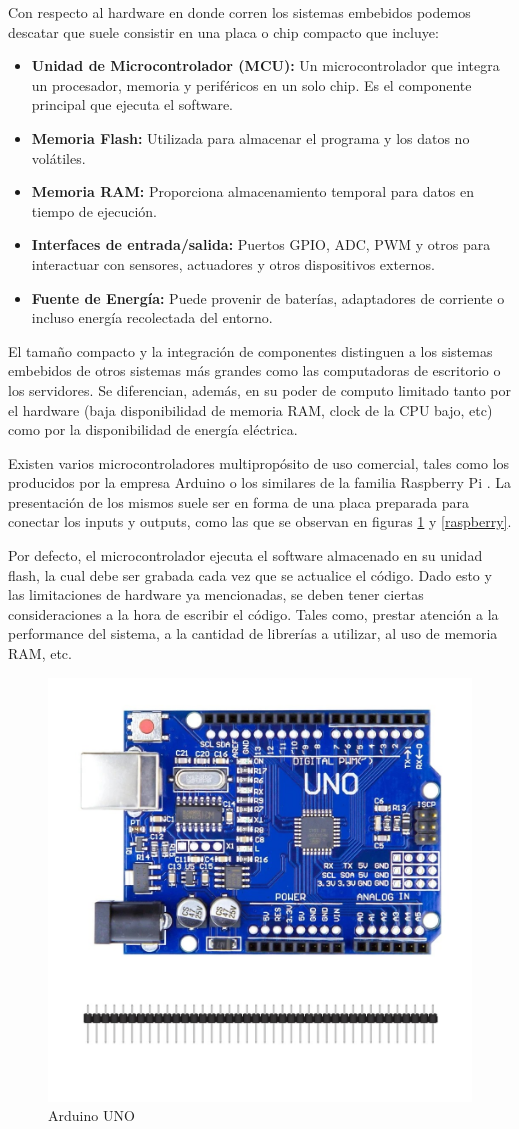 Con respecto al hardware en donde corren los sistemas embebidos podemos descatar que suele consistir en una placa o chip compacto que incluye:
\begin{itemize}
    \item \textbf{Unidad de Microcontrolador (MCU):} Un microcontrolador que integra un procesador, memoria y perif\'ericos en un solo chip. Es el componente principal que ejecuta el software.
    \item \textbf{Memoria Flash:} Utilizada para almacenar el programa y los datos no vol\'atiles.
    \item \textbf{Memoria RAM:} Proporciona almacenamiento temporal para datos en tiempo de ejecuci\'on.
    \item \textbf{Interfaces de entrada/salida:} Puertos \gls{GPIO}, \gls{ADC}, \gls{PWM} y otros para interactuar con sensores, actuadores y otros dispositivos externos.
    \item \textbf{Fuente de Energ\'ia:} Puede provenir de bater\'ias, adaptadores de corriente o incluso energ\'ia recolectada del entorno.
\end{itemize}
El tama\~no compacto y la integraci\'on de componentes distinguen a los sistemas embebidos de otros sistemas m\'as grandes como las computadoras de escritorio o los servidores. Se diferencian, además, en su poder de computo limitado tanto por el hardware (baja disponibilidad de memoria RAM, \gls{clock} de la CPU bajo, etc) como por la disponibilidad de energía eléctrica.

Existen varios microcontroladores multipropósito de uso comercial, tales como los producidos por la empresa Arduino \cite{arduinoMicro} o los similares de la familia  Raspberry Pi \cite{raspMicro}. La presentación de los mismos suele ser en forma de una placa preparada para conectar los inputs y outputs, como las que se observan en figuras \ref{arduinoUNO} y \ref{raspberry}.

Por defecto, el microcontrolador ejecuta el software almacenado en su unidad flash, la cual debe ser grabada cada vez que se actualice el código. Dado esto y las limitaciones de hardware ya mencionadas, se deben tener ciertas consideraciones a la hora de escribir el código. Tales como, prestar atención a la performance del sistema, a la cantidad de librerías a utilizar, al uso de memoria RAM, etc.

\begin{figure}[h!]
	\caption{Arduino UNO}
	\label{arduinoUNO}
	\centering
    \includegraphics[width=0.5\linewidth]{arduinoUNO.jpeg}
\end{figure}


